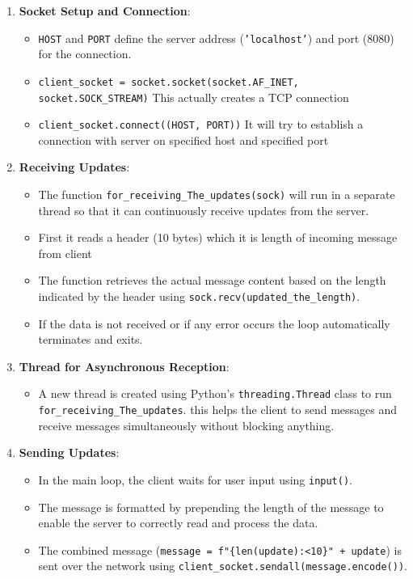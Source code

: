 \documentclass{exam}
\begin{document}
\begin{enumerate}
    \item \textbf{Socket Setup and Connection}:
    \begin{itemize}
        \item \texttt{HOST} and \texttt{PORT} define the server address (\texttt{'localhost'}) and port (8080) for the connection.
        \item \texttt{client\_socket = socket.socket(socket.AF\_INET, socket.SOCK\_STREAM)} This actually creates a TCP connection
        \item \texttt{client\_socket.connect((HOST, PORT))} 
        It will try to establish a connection with server on specified host and specified port
    \end{itemize}
    
    \item \textbf{Receiving Updates}:
    \begin{itemize}
        \item The function \texttt{for\_receiving\_The\_updates(sock)} 
        will run in a separate thread so that it can continuously receive updates from the server.
        
        
        \item First it reads a header (10 bytes)  which it is length of incoming message from client
    
        \item The function retrieves the actual message content based on the length indicated by the header using \texttt{sock.recv(updated\_the\_length)}.
        \item
        If the data is not received or if any error occurs the  loop automatically terminates and exits.
    \end{itemize}
    
    \item \textbf{Thread for Asynchronous Reception}:
    \begin{itemize}
        \item A new thread is created using Python's \texttt{threading.Thread} class to run \\ \texttt{for\_receiving\_The\_updates}. 
        this helps the client to send messages and receive messages simultaneously without blocking anything.
    \end{itemize}
    
    \item \textbf{Sending Updates}:
    \begin{itemize}
        \item In the main loop, the client waits for user input using \texttt{input()}.
        \item The message is formatted by prepending the length of the message  to enable the server to correctly read and process the data.
        \item The combined message (\texttt{message = f"\{len(update):<10\}" + update}) is sent over the network using \texttt{client\_socket.sendall(message.encode())}.
    \end{itemize}
    

\end{enumerate}
\end{document}
